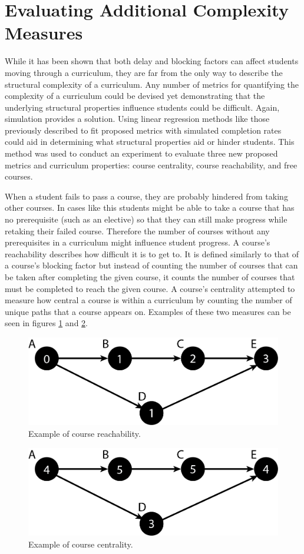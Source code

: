 \documentclass[botnum, fleqn]{unmeethesis}
\begin{document}
  \section{Evaluating Additional Complexity Measures}  
    While it has been shown that both delay and blocking factors can affect students moving through a curriculum, they are far from the only way to describe the structural complexity of a curriculum. Any number of metrics for quantifying the complexity of a curriculum could be devised yet demonstrating that the underlying structural properties influence students could be difficult. Again, simulation provides a solution. Using linear regression methods like those previously described to fit proposed metrics with simulated completion rates could aid in determining what structural properties aid or hinder students. This method was used to conduct an experiment to evaluate three new proposed metrics and curriculum properties: course centrality, course reachability, and free courses.

    When a student fails to pass a course, they are probably hindered from taking other courses. In cases like this students might be able to take a course that has no prerequisite (such as an elective) so that they can still make progress while retaking their failed course. Therefore the number of courses without any prerequisites in a curriculum might influence student progress. A course's reachability describes how difficult it is to get to. It is defined similarly to that of a course's blocking factor but instead of counting the number of courses that can be taken after completing the given course, it counts the number of courses that must be completed to reach the given course. A course's centrality attempted to measure how central a course is within a curriculum by counting the number of unique paths that a course appears on. Examples of these two measures can be seen in figures \ref{fig:Reachability} and \ref{fig:Centrality}.

    \begin{figure}
      \centering
      \includegraphics[width=0.5\linewidth]{./figures/Reachability.png}
      \caption{Example of course reachability.}
      \label{fig:Reachability}
    \end{figure}
    \vspace{0.5in}
    \begin{figure}
      \centering
      \includegraphics[width=0.5\linewidth]{./figures/Centrality.png}
      \caption{Example of course centrality.}
      \label{fig:Centrality}
    \end{figure}
\end{document}
